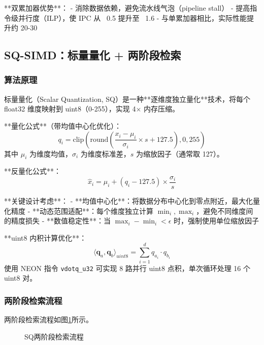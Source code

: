 \documentclass[a4paper]{article}
\begin{document}
**双累加器优势**：
- 消除数据依赖，避免流水线气泡（pipeline stall）
- 提高指令级并行度（ILP），使 IPC 从 ~0.5 提升至 ~1.6
- 与单累加器相比，实际性能提升约 20-30%

\subsection{SQ-SIMD：标量量化 + 两阶段检索}

\subsubsection{算法原理}

标量量化（Scalar Quantization, SQ）是一种**逐维度独立量化**技术，将每个 float32 维度映射到 uint8（0-255），实现 4$\times$ 内存压缩。

**量化公式**（带均值中心化优化）：
$$q_i = \text{clip}\left(\text{round}\left(\frac{x_i - \mu_i}{\sigma_i} \times s + 127.5\right), 0, 255\right)$$
其中 $\mu_i$ 为维度均值，$\sigma_i$ 为维度标准差，$s$ 为缩放因子（通常取 127）。

**反量化公式**：
$$\hat{x}_i = \mu_i + (q_i - 127.5) \times \frac{\sigma_i}{s}$$

**关键设计考虑**：
- **均值中心化**：将数据分布中心化到零点附近，最大化量化精度
- **动态范围适配**：每个维度独立计算 $\min_i, \max_i$，避免不同维度间的精度损失
- **数值稳定性**：当 $\max_i - \min_i < \epsilon$ 时，强制使用单位缩放因子

**uint8 内积计算优化**：
$$\langle \mathbf{q}_a, \mathbf{q}_b \rangle_{uint8} = \sum_{i=1}^{d} q_{a_i} \cdot q_{b_i}$$
使用 NEON 指令 \texttt{vdotq\_u32} 可实现 8 路并行 uint8 点积，单次循环处理 16 个 uint8 对。

\subsubsection{两阶段检索流程}

两阶段检索流程如图\ref{fig:sq_flow}所示。

\begin{figure}[H]
\centering
{}
\caption{SQ两阶段检索流程}
\label{fig:sq_flow}
\end{figure}
\end{document}
